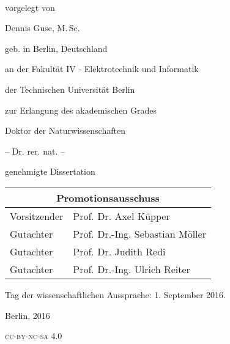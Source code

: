 \begin{titlepage}
    \begin{addmargin}[-1cm]{-3cm}
    \begin{center}
        \large  

        \hfill

        \vfill

        \vspace{3cm}

        \begingroup
            \color{Maroon}\spacedallcaps{\myTitle} \\ \bigskip
        \endgroup

        \vspace{1.6cm}	
				vorgelegt von
				
				\vspace{0.7cm}	
				Dennis Guse, M.\,Sc. 
				
				geb. in Berlin, Deutschland



				\vspace{0.7cm}
				an der Fakultät IV - Elektrotechnik und Informatik
				
				der Technischen Universität Berlin
				
				zur Erlangung des akademischen Grades

				\vspace{0.7cm}
				Doktor der Naturwissenschaften
				
				-- Dr. rer. nat. --

				\vspace{0.7cm}
				genehmigte Dissertation
				\vspace{1.4cm}
				
				\centering
				\large
				\begin{tabular}{ll}
				\multicolumn{2}{c}{Promotionsausschuss} \\
				\hline				
				Vorsitzender  & Prof. Dr. Axel Küpper  \\
				Gutachter	& Prof. Dr.-Ing. Sebastian Möller \\
				Gutachter	& Prof. Dr. Judith Redi \\
				Gutachter	& Prof. Dr.-Ing. Ulrich Reiter \\
				\end{tabular}
			
				\vspace{0.7cm}
				Tag der wissenschaftlichen Aussprache: 1. September 2016.



				\vspace{1.4cm}
				Berlin, 2016

				\vspace{0.7cm}	
				\textsc{\MakeLowercase{CC-BY-NC-SA 4.0}}

        \vfill                      

    \end{center}  
  \end{addmargin}       
\end{titlepage}   
